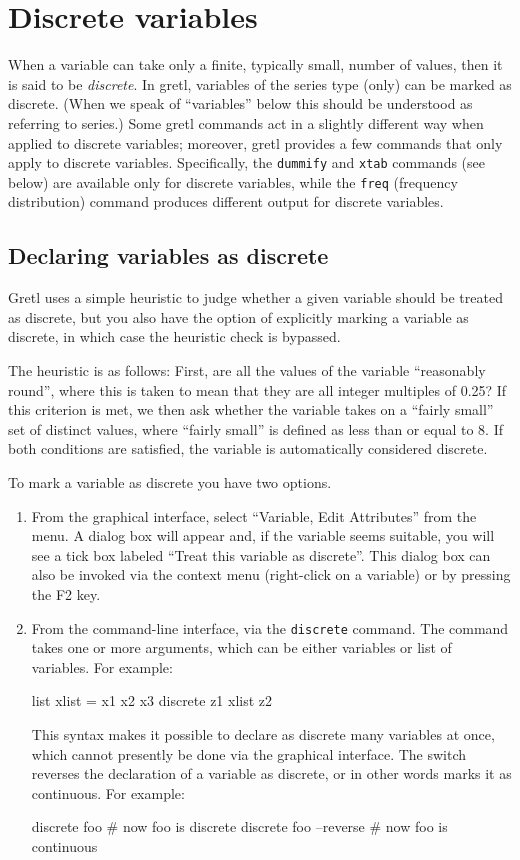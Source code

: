 \chapter{Discrete variables}
\label{chap:discrete}

When a variable can take only a finite, typically small, number of
values, then it is said to be \emph{discrete}. In gretl, variables of
the series type (only) can be marked as discrete. (When we speak of
``variables'' below this should be understood as referring to series.)
Some gretl commands act in a slightly different way when applied to
discrete variables; moreover, gretl provides a few commands that only
apply to discrete variables.  Specifically, the \texttt{dummify} and
\texttt{xtab} commands (see below) are available only for discrete
variables, while the \texttt{freq} (frequency distribution) command
produces different output for discrete variables.


\section{Declaring variables as discrete}
\label{discr-declare}

Gretl uses a simple heuristic to judge whether a given variable
should be treated as discrete, but you also have the option of
explicitly marking a variable as discrete, in which case the heuristic
check is bypassed.

The heuristic is as follows: First, are all the values of the variable
``reasonably round'', where this is taken to mean that they are all
integer multiples of 0.25?  If this criterion is met, we then ask
whether the variable takes on a ``fairly small'' set of distinct
values, where ``fairly small'' is defined as less than or equal to 8.
If both conditions are satisfied, the variable is automatically
considered discrete.

To mark a variable as discrete you have two options.
\begin{enumerate}
\item From the graphical interface, select ``Variable, Edit
  Attributes'' from the menu. A dialog box will appear and, if the
  variable seems suitable, you will see a tick box labeled ``Treat
  this variable as discrete''.  This dialog box can also be invoked
  via the context menu (right-click on a variable) or by pressing the
  F2 key.
\item From the command-line interface, via the \texttt{discrete}
  command. The command takes one or more arguments, which can be
  either variables or list of variables. For example:
\begin{code}
list xlist = x1 x2 x3
discrete z1 xlist z2
\end{code}
This syntax makes it possible to declare as discrete many
variables at once, which cannot presently be done via the graphical
interface. The switch  reverses the declaration of a
variable as discrete, or in other words marks it as continuous.
For example:
\begin{code}
discrete foo
# now foo is discrete
discrete foo --reverse
# now foo is continuous
\end{code}
\end{enumerate}

